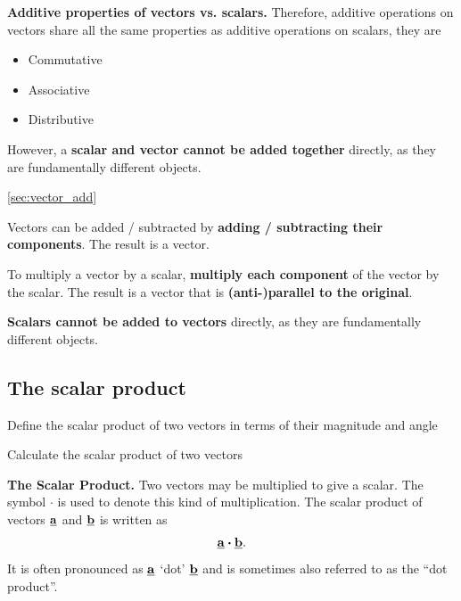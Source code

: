 \textbf{Additive properties of vectors vs. scalars.} Therefore, additive operations on vectors share all the same properties as additive operations on scalars, they are
\begin{itemize}
\item Commutative
\item Associative
\item Distributive
\end{itemize}

However, a \textbf{scalar and vector cannot be added together} directly, as they are fundamentally different objects.

\begin{recap}{\ref{sec:vector_add}}
\item Vectors can be added / subtracted by \textbf{adding / subtracting their components}. The result is a vector.
\item To multiply a vector by a scalar, \textbf{multiply each component} of the vector by the scalar. The result is a vector that is \textbf{(anti-)parallel to the original}.
\item \textbf{Scalars cannot be added to vectors} directly, as they are fundamentally different objects.
\end{recap}

\subsection{The scalar product}
\label{sec:scalar_prod}

\begin{learningoutcomes}
\item Define the scalar product of two vectors in terms of their magnitude and angle
\item Calculate the scalar product of two vectors
\end{learningoutcomes}

\textbf{The Scalar Product.} Two vectors may be multiplied to give a scalar. The symbol $\boldsymbol{\cdot}$ is used to denote this kind of multiplication. The scalar product of vectors $\underline{\mathbf{a}}$ and $\underline{\mathbf{b}}$ is written as
\[
\underline{\mathbf{a}}\boldsymbol{\cdot}\underline{\mathbf{b}}.
\]
It is often pronounced as $\underline{\mathbf{a}}$ `dot' $\underline{\mathbf{b}}$ and is sometimes also referred to as the ``dot product''.

